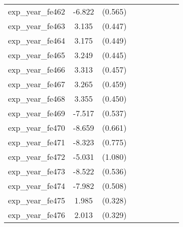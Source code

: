 {\begin{tabular}{l*{4}{cc}}
exp\_year\_fe462&   -6.822\sym{***}&  (0.565)&                  &         &                  &         &                  &         \\
exp\_year\_fe463&    3.135\sym{***}&  (0.447)&                  &         &                  &         &                  &         \\
exp\_year\_fe464&    3.175\sym{***}&  (0.449)&                  &         &                  &         &                  &         \\
exp\_year\_fe465&    3.249\sym{***}&  (0.445)&                  &         &                  &         &                  &         \\
exp\_year\_fe466&    3.313\sym{***}&  (0.457)&                  &         &                  &         &                  &         \\
exp\_year\_fe467&    3.265\sym{***}&  (0.459)&                  &         &                  &         &                  &         \\
exp\_year\_fe468&    3.355\sym{***}&  (0.450)&                  &         &                  &         &                  &         \\
exp\_year\_fe469&   -7.517\sym{***}&  (0.537)&                  &         &                  &         &                  &         \\
exp\_year\_fe470&   -8.659\sym{***}&  (0.661)&                  &         &                  &         &                  &         \\
exp\_year\_fe471&   -8.323\sym{***}&  (0.775)&                  &         &                  &         &                  &         \\
exp\_year\_fe472&   -5.031\sym{***}&  (1.080)&                  &         &                  &         &                  &         \\
exp\_year\_fe473&   -8.522\sym{***}&  (0.536)&                  &         &                  &         &                  &         \\
exp\_year\_fe474&   -7.982\sym{***}&  (0.508)&                  &         &                  &         &                  &         \\
exp\_year\_fe475&    1.985\sym{***}&  (0.328)&                  &         &                  &         &                  &         \\
exp\_year\_fe476&    2.013\sym{***}&  (0.329)&                  &         &                  &         &                  &         \\

\end{tabular}}
